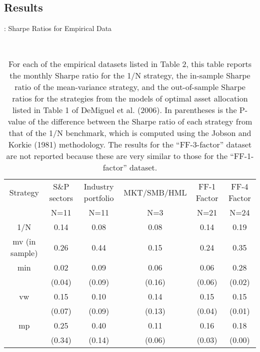 \documentclass[11pt]{article}
\begin{document}
\subsection{Results}

\begin{table}[H]
\centering
\caption {: Sharpe Ratios for Empirical Data} \label{tab:table1} \\
\caption*{For each of the empirical datasets listed in Table 2, this table reports the monthly Sharpe ratio for
the 1/N strategy, the in-sample Sharpe ratio of the mean-variance strategy, and the out-of-sample
Sharpe ratios for the strategies from the models of optimal asset allocation listed in Table 1 of DeMiguel et al. (2006). In
parentheses is the P-value of the difference between the Sharpe ratio of each strategy from that of the
1/N benchmark, which is computed using the Jobson and Korkie (1981) methodology. The results for the “FF-3-factor” dataset are not reported because these are very similar
to those for the “FF-1-factor” dataset. }



\begin{tabular}{cccccc}
  \hline
 Strategy & S\&P sectors & Industry portfolio & MKT/SMB/HML & FF-1 Factor & FF-4 Factor \\ 
  & N=11 & N=11 & N=3 & N=21 & N=24 \\
  \hline
1/N & 0.14 & 0.08 & 0.08 & 0.14 & 0.19 \\ 
  mv (in sample) & 0.26 & 0.44 & 0.15 & 0.24 & 0.35 \\ 
  min & 0.02 & 0.09 & 0.06 & 0.06 & 0.28 \\ 
  & (0.04) & (0.09) & (0.16) & (0.06) & (0.02) \\
  vw & 0.15 & 0.10 & 0.14 & 0.15 & 0.15 \\ 
  & (0.07) & (0.09) & (0.13) & (0.04) & (0.01) \\
  mp & 0.25 & 0.40 & 0.11 & 0.16 & 0.18 \\
  & (0.34) & (0.14) & (0.06) & (0.03) & (0.00) \\
   \hline
\end{tabular}
\end{table}
\end{document}
